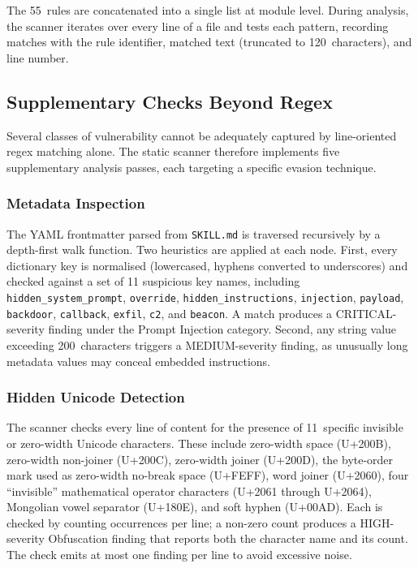 The 55~rules are concatenated into a single list at module level. During analysis, the scanner iterates over every line of a file and tests each pattern, recording matches with the rule identifier, matched text (truncated to 120~characters), and line number.

\subsection{Supplementary Checks Beyond Regex}

Several classes of vulnerability cannot be adequately captured by line-oriented regex matching alone. The static scanner therefore implements five supplementary analysis passes, each targeting a specific evasion technique.

\subsubsection{Metadata Inspection}

The YAML frontmatter parsed from \texttt{SKILL.md} is traversed recursively by a depth-first walk function. Two heuristics are applied at each node. First, every dictionary key is normalised (lowercased, hyphens converted to underscores) and checked against a set of 11 suspicious key names, including \texttt{hidden\_system\_prompt}, \texttt{override}, \texttt{hidden\_instructions}, \texttt{injection}, \texttt{payload}, \texttt{backdoor}, \texttt{callback}, \texttt{exfil}, \texttt{c2}, and \texttt{beacon}. A match produces a CRITICAL-severity finding under the Prompt Injection category. Second, any string value exceeding 200~characters triggers a MEDIUM-severity finding, as unusually long metadata values may conceal embedded instructions.

\subsubsection{Hidden Unicode Detection}

The scanner checks every line of content for the presence of 11~specific invisible or zero-width Unicode characters. These include zero-width space (U+200B), zero-width non-joiner (U+200C), zero-width joiner (U+200D), the byte-order mark used as zero-width no-break space (U+FEFF), word joiner (U+2060), four ``invisible'' mathematical operator characters (U+2061 through U+2064), Mongolian vowel separator (U+180E), and soft hyphen (U+00AD). Each is checked by counting occurrences per line; a non-zero count produces a HIGH-severity Obfuscation finding that reports both the character name and its count. The check emits at most one finding per line to avoid excessive noise.

